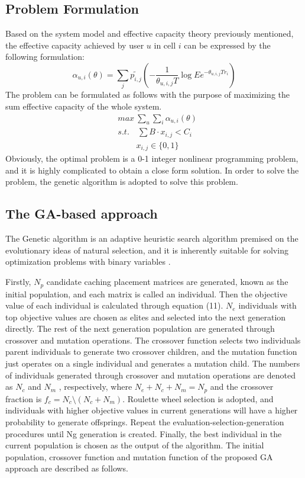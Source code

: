 \documentclass[conference]{IEEEtran}
\begin{document}
\subsection{Problem Formulation}
Based on the system model and effective capacity theory previously mentioned, the effective capacity achieved by user $u$ in cell $i$ can be expressed by the following formulation:
\begin{equation}
\alpha_{u,i}(\theta)=\sum_j\tilde{p_{i,j}}(-\frac{1}{\theta_{u,i,j}T}\log Ee^{-\theta_{u,i,j}Tr_i})
\end{equation}
The problem can be formulated as follows with the purpose of maximizing the sum effective capacity of the whole system.
\begin{equation}
 \begin{aligned}
   & {max}\ \sum_u\sum_i\alpha_{u,i}(\theta)\\
   & s.t. \quad\sum B\cdot x_{i,j}<C_i\\
   & \qquad \ x_{i,j}\in\{0,1\}
 \end{aligned}
\end{equation}
Obviously, the optimal problem is a 0-1 integer nonlinear programming problem, and it is highly complicated to obtain a close form solution. In order to solve the problem, the genetic algorithm is adopted to solve this problem.

\subsection{The GA-based approach}
The Genetic algorithm is an adaptive heuristic search algorithm premised on the evolutionary ideas of natural selection, and it is inherently suitable for solving optimization problems with binary variables \cite{Srinivas2002Genetic}.

Firstly, $N_p$ candidate caching placement matrices are generated, known as the initial population, and each matrix is called an individual. Then the objective value of each individual is calculated through equation (11). $N_e$ individuals with top objective values are chosen as elites and selected into the next generation directly. The rest of the next generation population are generated through crossover and mutation operations. The crossover function selects two individuals parent individuals to generate two crossover children, and the mutation function just operates on a single individual and generates a mutation child. The numbers of individuals generated through crossover and mutation operations are denoted as $N_c$ and $N_m$ , respectively, where $N_e+N_c+N_m=N_p$ and the crossover fraction is $f_c=N_c\setminus (N_c+N_m)$. Roulette wheel selection is adopted, and individuals with higher objective values in current generations will have a higher probability to generate offsprings. Repeat the evaluation-selection-generation procedures until Ng generation is created. Finally, the best individual in the current population is chosen as the output of the algorithm. The initial population, crossover function and mutation function of the proposed GA approach are described as follows.
\end{document}
